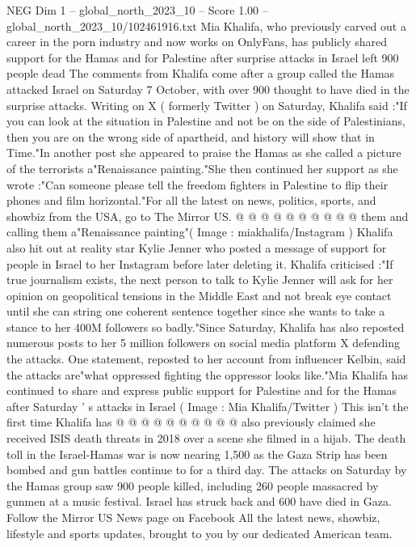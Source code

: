 \begin{textsample}{NEG Dim 1 – global\_north\_2023\_10 – Score 1.00 – global\_north\_2023\_10/102461916.txt}  \label{ex:f1_neg_133}
Mia Khalifa, who previously carved out a career in the porn industry and now works on OnlyFans, has publicly shared support for the Hamas and for Palestine after surprise attacks in Israel left 900 people dead The comments from Khalifa come after a group called the Hamas attacked Israel on Saturday 7 October, with over 900 thought to have died in the surprise attacks.
Writing on X ( formerly Twitter ) on Saturday, Khalifa said :"If you can look at the situation in Palestine and not be on the side of Palestinians, then you are on the wrong side of apartheid, and history will show that in Time."In another post she appeared to praise the Hamas as she called a picture of the terrorists a"Renaissance painting."She then continued her support as she wrote :"Can someone please tell the freedom fighters in Palestine to flip their phones and film horizontal."For all the latest on news, politics, sports, and showbiz from the USA, go to The Mirror US. @ @ @ @ @ @ @ @ @ @ them and calling them a"Renaissance painting"( Image : miakhalifa/Instagram ) Khalifa also hit out at reality star Kylie Jenner who posted a message of support for people in Israel to her Instagram before later deleting it.
Khalifa criticised :"If true journalism exists, the next person to talk to Kylie Jenner will ask for her opinion on geopolitical tensions in the Middle East and not break eye contact until she can string one coherent sentence together since she wants to take a stance to her 400M followers so badly."Since Saturday, Khalifa has also reposted numerous posts to her 5 million followers on social media platform X defending the attacks.
One statement, reposted to her account from influencer Kelbin, said the attacks are"what oppressed fighting the oppressor looks like."Mia Khalifa has continued to share and express public support for Palestine and for the Hamas after Saturday ' s attacks in Israel ( Image : Mia Khalifa/Twitter ) This isn't the first time Khalifa has @ @ @ @ @ @ @ @ @ @ also previously claimed she received ISIS death threats in 2018 over a scene she filmed in a hijab.
The death toll in the Israel-Hamas war is now nearing 1,500 as the Gaza Strip has been bombed and gun battles continue to for a third day.
The attacks on Saturday by the Hamas group saw 900 people killed, including 260 people massacred by gunmen at a music festival.
Israel has struck back and 600 have died in Gaza.
Follow the Mirror US News page on Facebook All the latest news, showbiz, lifestyle and sports updates, brought to you by our dedicated American team.

\end{textsample}
